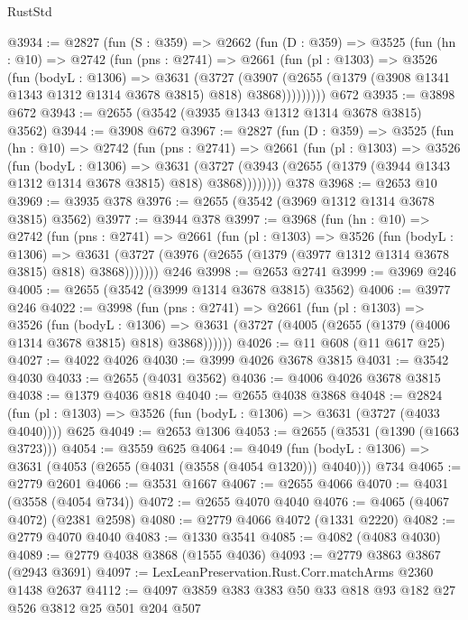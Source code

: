 \begin{lexlean}{RustStd}
\begin{coremodule}
@3934 := @2827
    (fun (S : @359) =>
    @2662
      (fun (D : @359) =>
      @3525
        (fun (hn : @10) =>
        @2742
          (fun (pns : @2741) =>
          @2661
            (fun (pl : @1303) =>
            @3526
              (fun (bodyL : @1306) =>
              @3631
                (@3727
                  (@3907
                    (@2655 (@1379 (@3908 @1341 @1343 @1312 @1314 @3678 @3815) @818) @3868)))))))))
    @672
@3935 := @3898 @672
@3943 := @2655 (@3542 (@3935 @1343 @1312 @1314 @3678 @3815) @3562)
@3944 := @3908 @672
@3967 := @2827
    (fun (D : @359) =>
    @3525
      (fun (hn : @10) =>
      @2742
        (fun (pns : @2741) =>
        @2661
          (fun (pl : @1303) =>
          @3526
            (fun (bodyL : @1306) =>
            @3631
              (@3727 (@3943 (@2655 (@1379 (@3944 @1343 @1312 @1314 @3678 @3815) @818) @3868))))))))
    @378
@3968 := @2653 @10
@3969 := @3935 @378
@3976 := @2655 (@3542 (@3969 @1312 @1314 @3678 @3815) @3562)
@3977 := @3944 @378
@3997 := @3968
    (fun (hn : @10) =>
    @2742
      (fun (pns : @2741) =>
      @2661
        (fun (pl : @1303) =>
        @3526
          (fun (bodyL : @1306) =>
          @3631 (@3727 (@3976 (@2655 (@1379 (@3977 @1312 @1314 @3678 @3815) @818) @3868)))))))
    @246
@3998 := @2653 @2741
@3999 := @3969 @246
@4005 := @2655 (@3542 (@3999 @1314 @3678 @3815) @3562)
@4006 := @3977 @246
@4022 := @3998
    (fun (pns : @2741) =>
    @2661
      (fun (pl : @1303) =>
      @3526
        (fun (bodyL : @1306) =>
        @3631 (@3727 (@4005 (@2655 (@1379 (@4006 @1314 @3678 @3815) @818) @3868))))))
@4026 := @11 @608 (@11 @617 @25)
@4027 := @4022 @4026
@4030 := @3999 @4026 @3678 @3815
@4031 := @3542 @4030
@4033 := @2655 (@4031 @3562)
@4036 := @4006 @4026 @3678 @3815
@4038 := @1379 @4036 @818
@4040 := @2655 @4038 @3868
@4048 := @2824 (fun (pl : @1303) => @3526 (fun (bodyL : @1306) => @3631 (@3727 (@4033 @4040)))) @625
@4049 := @2653 @1306
@4053 := @2655 (@3531 (@1390 (@1663 @3723)))
@4054 := @3559 @625
@4064 := @4049
    (fun (bodyL : @1306) => @3631 (@4053 (@2655 (@4031 (@3558 (@4054 @1320))) @4040)))
    @734
@4065 := @2779 @2601
@4066 := @3531 @1667
@4067 := @2655 @4066
@4070 := @4031 (@3558 (@4054 @734))
@4072 := @2655 @4070 @4040
@4076 := @4065 (@4067 @4072) (@2381 @2598)
@4080 := @2779 @4066 @4072 (@1331 @2220)
@4082 := @2779 @4070 @4040
@4083 := @1330 @3541
@4085 := @4082 (@4083 @4030)
@4089 := @2779 @4038 @3868 (@1555 @4036)
@4093 := @2779 @3863 @3867 (@2943 @3691)
@4097 := LexLeanPreservation.Rust.Corr.matchArms @2360 @1438 @2637
@4112 := @4097 @3859 @383 @383 @50 @33 @818 @93 @182 @27 @526 @3812 @25 @501 @204 @507

\end{coremodule}
\end{lexlean}
